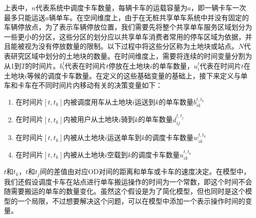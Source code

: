 \documentclass[]{tongjithesis}
\numberwithin{equation}{chapter}
\begin{document}
上表中，$n$代表系统中调度卡车数量，每辆卡车的运载容量为$a$，即一辆卡车一次最多只能运送$a$辆单车。在空间维度上，由于在无桩共享单车系统中并没有固定的车辆停放点，为了表示车辆停放位置，我们需要先将整个共享单车服务区域划分为一些更小的分区，这些分区的划分应以共享单车消费者常用的停车区域为依据，并且能被视为没有停放数量的限制。以下过程中将这些分区称为土地块或站点。$N$代表研究区域中划分的土地块的数量。在时间维度上，需要将连续的时间变量分割为从1到$T$的时间片。$b_i^t$代表在时间片$t$停放在土地块$i$的单车数量，$u_i^t$代表在时间片$t$在土地块$i$等候的调度卡车数量。在定义的这些基础变量的基础上，接下来定义与单车和卡车在不同时间片内移动有关的决策变量如下：
\begin{enumerate}
	\item 在时间片$[t,t_k]$内被调度用车从土地块$i$运送到$k$的单车数量$b_{ik}^{t,t_k}$
	\item 在时间片$[t,t_k]$内被用户从土地块$i$骑到$k$的单车数量$d_{ij}^{t,t_j}$
	\item 在时间片$[t,t_k]$内被从土地块$i$运送单车到$k$的调度卡车数量$w_{ik}^{t,t_k}$
	\item 在时间片$[t,t_k]$内被从土地块$i$空载到$k$的调度卡车数量$u_{ik}^{t,t_k}$
\end{enumerate}

$t$和$t_k$，$t$和$t_j$间的差值由对应OD对间的距离和单车或卡车的速度决定。在模型中，我们还假设调度卡车在站点进行单车搬运操作的时间为一个常数，即这个时间不会随需要搬运的单车的数量变化。虽然这个假设是为了简化模型，但也同时是这个模型的一个局限，不过想要解决这个问题，可以在模型中添加一个表示操作时间的变量。
\end{document}
